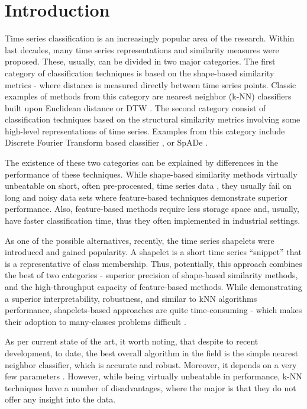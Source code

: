 \documentclass{llncs}
\begin{document}
\section{Introduction}
%
Time series classification is an increasingly popular area of the research. Within last decades,
many time series representations and similarity measures were proposed. These, usually, can be
divided in two major categories. The first category of classification techniques is based on
the shape-based similarity metrics - where distance is measured directly between time series
points. Classic examples of methods from this category are nearest neighbor (k-NN) classifiers
built upon Euclidean distance or DTW \cite{1NN}. The second category consist of classification
techniques based on the structural similarity metrics involving some high-level representations
of time series. Examples from this category include Discrete Fourier Transform based classifier
\cite{DFT}, or SpADe \cite{spade}. 

The existence of these two categories can be explained by differences in the performance of these
techniques. While shape-based similarity methods virtually unbeatable on short, often pre-processed,
time series data \cite{benchmark}, they usually fail on long and noisy data sets \cite{indexing}
where feature-based techniques demonstrate superior performance. Also, feature-based methods
require less storage space and, usually, have faster classification time, thus they often
implemented in industrial settings. 

As one of the possible alternatives, recently, the time series shapelets were introduced 
\cite{shapelet} and gained popularity. A shapelet is a short time series ``snippet'' that is a 
representative of class membership. Thus, potentially, this approach combines the best of two
categories - superior precision of shape-based similarity methods, and the high-throughput 
capacity of feature-based methods\cite{logical}. While demonstrating a superior interpretability, 
robustness, and similar to kNN algorithms performance, shapelets-based approaches are quite 
time-consuming - which makes their adoption to many-classes problems difficult \cite{bagnal}. 

As per current state of the art, it worth noting, that despite to recent development, to date, the
best overall algorithm in the field is the simple nearest neighbor classifier, which is accurate
and robust. Moreover, it depends on a very few parameters \cite{comparison}
\cite{classifiers} \cite{benchmark}. However, while being virtually unbeatable in performance,
k-NN techniques have a number of disadvantages, where the major is that they do not offer any 
insight into the data.
\end{document}
